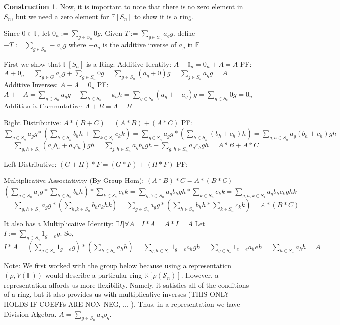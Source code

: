 \documentclass{article}
\theoremstyle{definition}
\newtheorem{construction}{Construction}
\begin{document}
\begin{construction}
Now, it is important to note that there is no zero element in $S_n$, but we need a zero element for $\mathbb{F}[S_n]$ to show it is a ring.

Since $0 \in \mathbb{F}$, let $0_n := \sum_{g\in S_n}0g$.
Given $ T := \sum_{g \in S_n} a_g g $, define $ -T := \sum_{g \in S_n} -a_g g $ where $-a_g$ is the additive inverse of $a_g$ in $\mathbb{F}$

First we show that $\mathbb{F}[S_n]$ is a Ring:
Additive Identity: $ A + 0_n = 0_n + A = A$
PF: $A + 0_n = \sum_{g \in G} a_g g + \sum_{g\in S_n} 0g = \sum_{g \in S_n} (a_g + 0)g = \sum_{g \in S_n} a_g g = A  $
Additive Inverses: $ A - A = 0_n $ 
PF: $A + -A = \sum_{g\in S_n} a_g g + \sum_{h \in S_n} -a_h h = \sum_{g \in S_n} (a_g + -a_g) g = \sum_{g \in S_n} 0g = 0_n $
Addition is Commutative: $A+ B = A + B$

Right Distributive: $ A * (B +C) = (A*B) + (A*C)$
PF: $\sum_{g\in S_n} a_g g * ( \sum_{h \in S_n} b_h h + \sum_{k \in S_n} c_k k) =\sum_{g\in S_n} a_g g * (\sum_{h \in S_n} (b_h + c_h) h ) = \sum_{g,h \in S_n} a_g(b_h + c_h) gh$ $= \sum_{g,h \in S_n} (a_g b_h + a_g c_h) gh = \sum_{g,h \in S_n} a_g b_h gh + \sum_{g,h \in S_n} a_g c_h gh
= A*B + A*C$

Left Distributive: $ (G+H)*F = (G*F) + (H*F)$
PF: 

Multiplicative Associativity (By Group Hom): $(A*B) *C = A* (B*C)$
$ (\sum_{g\in S_n} a_g g * \sum_{h\in S_n} b_h h) * \sum_{k\in S_n} c_k k   = \sum_{g,h\in S_n} a_g b_h gh * \sum_{k\in S_n} c_k k = \sum_{g,h,k\in S_n} a_g b_h c_k ghk $
$= \sum_{g,h\in S_n} a_g g * (\sum_{h,k\in S_n} b_h c_k hk) = \sum_{g\in S_n} a_g g * (\sum_{h\in S_n} b_h h * \sum_{k\in S_n} c_k k) =  A *(B*C)     $

It also has a Multiplicative Identity: $ \exists I | \forall A \quad  I*A = A*I = A $
Let $I := \sum_{g\in S_n} 1_{g=e} g $. So, $I * A = (\sum_{g\in S_n} 1_{g=e} g) * (\sum_{h\in S_n} a_h h) = \sum_{g,h\in S_n} 1_{g=e} a_h gh = \sum_{g\in S_n} 1_{e=e}a_h eh = \sum_{h\in S_n} a_h h = A$
\end{construction}

Note: We first worked with the group below because using a representation $(\rho, V(\mathbb{F}))$ would describe a particular ring $ \mathbb{R}[\rho(\mathcal{S}_n)] $. However, a representation affords us more flexibility. Namely, it satisfies all of the conditions of a ring, but it also provides us with multiplicative inverses (THIS ONLY HOLDS IF COEFFs ARE NON-NEG, ... ). Thus, in a representation we have Division Algebra.
$A = \sum_{g\in S_n} a_g \rho_g $. 
\end{document}
